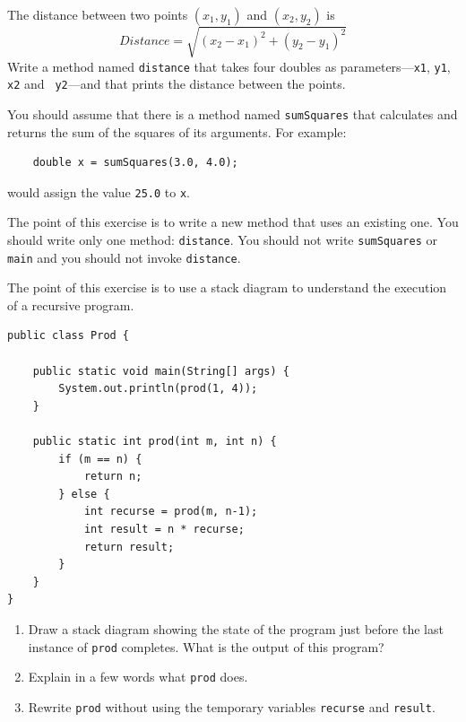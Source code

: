 \begin{exercise}
The distance between two points $(x_1, y_1)$ and $(x_2, y_2)$ is
%
\[ Distance = \sqrt{(x_2 - x_1)^2 +(y_2 - y_1)^2} \]
%
Write a method named {\tt distance} that takes four
doubles as parameters---{\tt x1}, {\tt y1}, {\tt x2} and {\tt
y2}---and that prints the distance between the points.

You should assume that there is a method named {\tt sumSquares}
that calculates and returns the sum of the squares of its arguments.
For example:

\begin{lstlisting}
    double x = sumSquares(3.0, 4.0);
\end{lstlisting}
%
would assign the value {\tt 25.0} to {\tt x}.

The point of this exercise is to write a new method that uses an
existing one.  You should write only one method: {\tt distance}.  You
should not write {\tt sumSquares} or {\tt main} and you should not
invoke {\tt distance}.
\end{exercise}


\begin{exercise}
The point of this exercise is to use a stack diagram to understand
the execution of a recursive program.

\begin{lstlisting}
public class Prod {

    public static void main(String[] args) {
        System.out.println(prod(1, 4));
    }

    public static int prod(int m, int n) {
        if (m == n) {
            return n;
        } else {
            int recurse = prod(m, n-1);
            int result = n * recurse;
            return result;
        }
    }
}
\end{lstlisting}
%
\begin{enumerate}

\item Draw a stack diagram showing the state of the program just
before the last instance of {\tt prod} completes.
What is the output of this program?

\item Explain in a few words what {\tt prod} does.

\item Rewrite {\tt prod} without using the temporary variables
{\tt recurse} and {\tt result}.

\end{enumerate}
\end{exercise}


